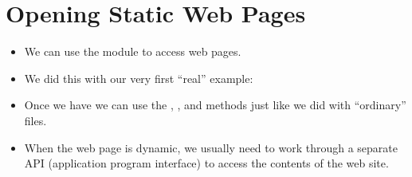 \documentclass[letterpaper,10pt,english]{sphinxmanual}
\begin{document}
\section{Opening Static Web Pages}
\label{\detokenize{lecture_notes/lec13_files_web:opening-static-web-pages}}\begin{itemize}
\item {} 
We can use the  module to access web pages.

\item {} 
We did this with our very first “real” example:

%
\begin{sphinxVerbatim}[commandchars=\\\{\}]
 
  
  
\end{sphinxVerbatim}

\item {} 
Once we have  we can use the , ,
and  methods just like we did with “ordinary” files.

\item {} 
When the web page is dynamic, we usually need to work through a
separate API (application program interface) to access the contents
of the web site.

\end{itemize}
\end{document}

